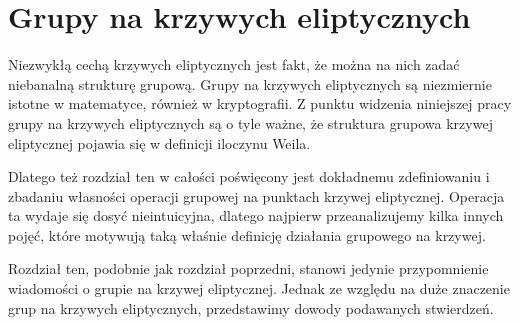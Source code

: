 \chapter{Grupy na krzywych eliptycznych}

Niezwykłą cechą krzywych eliptycznych jest fakt,
że można na nich zadać niebanalną strukturę grupową.
Grupy na krzywych eliptycznych
są niezmiernie istotne w matematyce,
również w kryptografii.
Z punktu widzenia niniejszej pracy
grupy na krzywych eliptycznych są o tyle ważne,
że struktura grupowa krzywej eliptycznej
pojawia się w definicji iloczynu Weila.

Dlatego też rozdział ten w całości poświęcony jest
dokładnemu zdefiniowaniu i zbadaniu własności
operacji grupowej na punktach krzywej eliptycznej.
Operacja ta wydaje się dosyć nieintuicyjna,
dlatego najpierw przeanalizujemy kilka innych pojęć,
które motywują taką właśnie
definicję działania grupowego na krzywej.

Rozdział ten, podobnie jak rozdział poprzedni,
stanowi jedynie przypomnienie wiadomości
o grupie na krzywej eliptycznej.
Jednak ze względu na duże znaczenie grup na krzywych eliptycznych,
przedstawimy dowody podawanych stwierdzeń.








